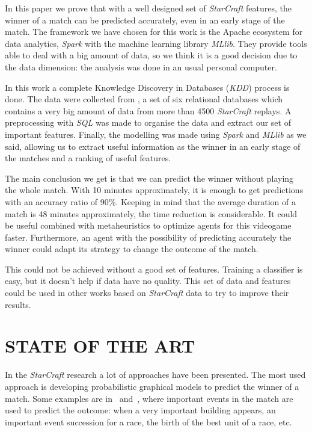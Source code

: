 \documentclass[a4paper,twoside]{article}\usepackage[]{graphicx}\usepackage[]{color}
\begin{document}

In this paper we prove that with a well designed set of \emph{StarCraft}
features, the winner of a match can be predicted accurately, even in an early
stage of the match.
The framework we have chosen for this
work is the Apache ecosystem for data analytics, \emph{Spark} with the machine
learning library \emph{MLlib}. They provide tools able to deal with a big
amount of data, so we think it is a good decision due to the data dimension:
the analysis was done in an usual personal computer.


In this work a complete Knowledge Discovery in Databases (\emph{KDD}) process
is done. The data were collected from \cite{DBLP:conf/flairs/RobertsonW14},
a set of six relational databases which contains a very big amount of data
from more than 4500 \emph{StarCraft} replays. A preprocessing with \emph{SQL}
was made to organise the data and extract our set of important features. Finally,
the modelling was made using \emph{Spark} and \emph{MLlib} as we said,
allowing us to extract useful information as the winner in an early stage of
the matches and a ranking of useful features.


The main conclusion we get is that we can predict the winner without playing
the whole match. With 10 minutes approximately,
it is enough to get predictions with an accuracy ratio of 90\%. Keeping in mind
that the average duration of a match is 48 minutes approximately, the time
reduction is considerable. It could be useful combined with metaheuristics to
optimize agents for this videogame faster. Furthermore, an agent with the
possibility of predicting accurately the winner could adapt its strategy to
change the outcome of the match.

This could not be achieved without a good set of features. Training a classifier
is easy, but it doesn't help if data have no
quality. This set of data and features could be used in other works based
on \emph{StarCraft} data to try to improve their results.


\section{\uppercase{State of the art}}
\label{sec:state}

\noindent In the \emph{StarCraft} research a lot of approaches have been presented.
The most used approach is developing probabilistic graphical models to predict
the winner of a match. Some examples are in~\cite{DBLP:conf/cig/SynnaeveB11a}
and~\cite{DBLP:conf/aiide/StanescuHEGB13}, where important events in the match
are used to predict the outcome: when a very important building appears,
an important event succession for a race, the birth of the best unit of a race,
etc.
\end{document}
